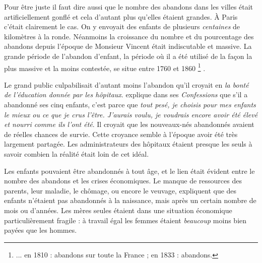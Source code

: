  Pour être juste il faut dire aussi que le nombre des abandons dans les villes était artificiellement gonflé et cela d'autant plus qu'elles étaient grandes. À Paris c'était clairement le cas. On y envoyait des enfants de plusieurs \emph{centaines} de kilomètres à la ronde. Néanmoins la croissance du nombre et du pourcentage des abandons depuis l'époque de Monsieur Vincent était indiscutable et massive. La grande période de l'abandon d'enfant, la période où il a été utilisé de la façon la plus massive et la moins contestée, se situe entre 1760 et 1860%
\footnote{... en 1810 :  abandons sur toute la France ; en 1833 :  abandons.}%
.

 Le grand public culpabilisait d'autant moins l'abandon qu'il croyait en \emph{la bonté de l'éducation donnée par les hôpitaux}.  explique dans ses \emph{Confessions} que s'il a abandonné ses cinq enfants, c'est parce que \emph{tout pesé, je choisis pour mes enfants le mieux ou ce que je crus l'être. J'aurais voulu, je voudrais encore avoir été élevé et nourri comme ils l'ont été}. Il croyait que les nouveaux-nés abandonnés avaient de réelles chances de survie. Cette croyance semble à l'époque avoir été très largement partagée. Les administrateurs des hôpitaux étaient presque les seuls à savoir combien la réalité était loin de cet idéal. 

 Les enfants pouvaient être abandonnés à tout âge, et le lien était évident entre le nombre des abandons et les crises économiques. Le manque de ressources des parents, leur maladie, le chômage, ou encore le veuvage, expliquent que des enfants n'étaient pas abandonnés à la naissance, mais après un certain nombre de mois ou d'années. Les mères seules étaient dans une situation économique particulièrement fragile : à travail égal les femmes étaient \emph{beaucoup} moins bien payées que les hommes. 



